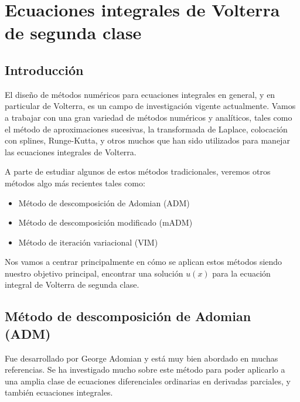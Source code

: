 \chapter{Ecuaciones integrales de Volterra de segunda clase}

\section{Introducción}
El diseño de métodos numéricos para ecuaciones integrales en general, y en particular de Volterra, es un campo de investigación vigente actualmente.
Vamos a trabajar con una gran variedad de métodos numéricos y analíticos, tales como el método de aproximaciones sucesivas, la transformada de Laplace, colocación con splines, Runge-Kutta, y otros muchos que han sido utilizados para manejar las ecuaciones integrales de Volterra.

A parte de estudiar algunos de estos métodos tradicionales, veremos otros métodos algo más recientes tales como:
\begin{itemize}
	\item Método de descomposición de Adomian (ADM)
	\item Método de descomposición modificado (mADM)
	\item Método de iteración variacional (VIM)
\end{itemize}
Nos vamos a centrar principalmente en cómo se aplican estos métodos siendo nuestro objetivo principal, encontrar una solución $u(x)$ para la ecuación integral de Volterra de segunda clase.
\section{Método de descomposición de Adomian (ADM)}
Fue desarrollado por George Adomian y está muy bien abordado en muchas referencias. Se ha investigado mucho sobre este método para poder aplicarlo a una amplia clase de ecuaciones diferenciales ordinarias en derivadas parciales, y también ecuaciones integrales.

